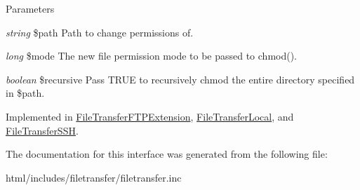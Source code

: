\begin{DoxyParams}{Parameters}
\item[{\em string}]\$path Path to change permissions of. \item[{\em long}]\$mode The new file permission mode to be passed to chmod(). \item[{\em boolean}]\$recursive Pass TRUE to recursively chmod the entire directory specified in \$path. \end{DoxyParams}


Implemented in \hyperlink{classFileTransferFTPExtension_a7256841ba293ae42126f05a4ab3dfe82}{FileTransferFTPExtension}, \hyperlink{classFileTransferLocal_a37439f6a788a20b31230cb5205d0272a}{FileTransferLocal}, and \hyperlink{classFileTransferSSH_adb2f9be936419a0f28593552d1856c24}{FileTransferSSH}.

The documentation for this interface was generated from the following file:\begin{DoxyCompactItemize}
\item 
html/includes/filetransfer/filetransfer.inc\end{DoxyCompactItemize}
